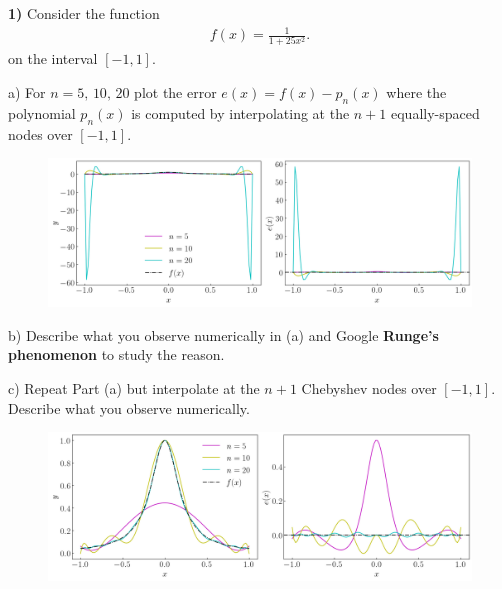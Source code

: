 \documentclass[12pt,a4paper]{article}
\newcommand{\prob}[2]{\textbf{#1)} #2}
\begin{document}
\prob{1}{Consider the function
\begin{align*}
    f(x) = \frac{1}{1 + 25 x^2}
.\end{align*}
on the interval $\left[ -1,1 \right]$.
}

a) For $n = 5,\,10,\,20$ plot the error $e(x) = f(x) - p_{n}(x)$ where the polynomial $p_{n}(x)$ is computed by interpolating at the $n+1$ equally-spaced nodes over $[-1,1]$.


\begin{figure}[H]
    \begin{center}
        \includegraphics[scale=0.45]{./fig1.png} 
    \end{center}
\end{figure}

b) Describe what you observe numerically in (a) and Google \textbf{Runge's phenomenon} to study the reason.

c) Repeat Part (a) but interpolate at the $n+1$ Chebyshev nodes over $[-1,1]$.
Describe what you observe numerically.

\begin{figure}[H]
    \begin{center}
        \includegraphics[scale=0.45]{./fig2.png} 
    \end{center}
\end{figure}
\end{document}
